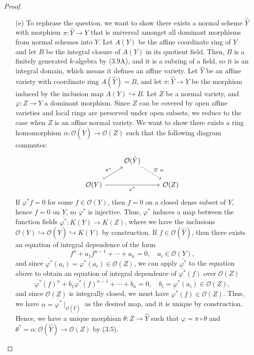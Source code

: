 \documentclass[12pt]{article}
\newcommand{\OO}{\mathcal{O}}
\theoremstyle{definition}
\begin{document}
\begin{enumerate} [label=\textbf{\arabic*.}, leftmargin=-0.05em]
\begin{proof}
\begin{itemize}
    \item[(e)] To rephrase the question, we want to show there exists a normal scheme  $\hat{Y}$ with morphism $\pi : \hat{Y} \to Y$ that is universal amongst all dominant morphisms from normal schemes into $Y$. Let $A(Y)$ be the affine coordinate ring of $Y$ and let $B$ be the integral closure of $A(Y)$ in its quotient field. Then, $B$ is a finitely generated $k$-algebra by (3.9A), and it is a subring of a field, so it is an integral domain, which means it defines an affine variety. Let $\hat{Y}$ be an affine variety with coordinate ring $A(\hat{Y}) = B$, and let $\pi : \hat{Y} \to Y$ be the morphism induced by the inclusion map $A(Y) \hookrightarrow B$. Let $Z$ be a normal variety, and $\varphi : Z \to Y$ a dominant morphism. Since $Z$ can be covered by open affine varieties and local rings are perserved under open subsets, we reduce to the case when $Z$ is an affine normal variety. We want to show there exists a ring homomorphism $\alpha : \OO(\hat{Y}) \to \OO(Z)$ such that the following diagram commutes:
    \[ \begin{tikzcd}
        & \OO(\hat{Y}) \arrow[rd, "\exists! ~ \alpha", dashed] &        \\
        \OO(Y) \arrow[rr, "\varphi^*"'] \arrow[ru, "\pi^*", hook] &                                                      & \OO(Z)
    \end{tikzcd} \]
    If $\varphi^*f = 0$ for some $f \in \OO(Y)$, then $f = 0$ on a closed dense subset of $Y$, hence $f = 0$ on $Y$, so $\varphi^*$ is injective. Thus, $\varphi^*$ induces a map between the function fields $\overline{\varphi^*} : K(Y) \to K(Z)$, where we have the inclusions $\OO(Y) \hookrightarrow \OO(\hat{Y}) \hookrightarrow K(Y)$ by construction. If $f \in \OO(\hat{Y})$, then there exists an equation of integral dependence of the form
    \begin{equation*}
        f^n + a_1 f^{n - 1} + \cdots +  a_n = 0, \quad a_i \in \OO(Y),
    \end{equation*}
    and since $\overline{\varphi^*}(a_i) = \varphi^*(a_i) \in \OO(Z)$, we can apply $\overline{\varphi^*}$ to the equation above to obtain an equation of integral dependence of $\overline{\varphi^*}(f)$ over $\OO(Z)$
    \begin{equation*}
        \overline{\varphi^*}(f)^n + b_1 \overline{\varphi^*}(f)^{n - 1} + \cdots + b_n = 0, \quad b_i = \varphi^*(a_i) \in \OO(Z),
    \end{equation*}
    and since $\OO(Z)$ is integrally closed, we must have $\overline{\varphi^*}(f) \in \OO(Z)$. Thus, we have $\alpha = \overline{\varphi^*} \mid_{\OO(\hat{Y})}$ as the desired map, and it is unique by construction. Hence, we have a unique morphism $\theta : Z \to \hat{Y}$ such that $\varphi = \pi \circ \theta$ and $\theta^* = \alpha : \OO(\hat{Y}) \to \OO(Z)$ by (3.5).
   \end{itemize}
\end{proof}


\end{enumerate}
\end{document}
